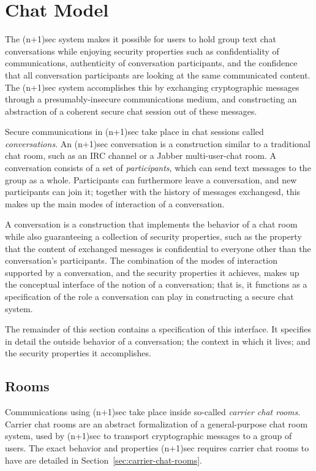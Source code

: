 \documentclass{article}
\begin{document}
\section{Chat Model}
\label{sec:chat-model}

The (n+1)sec system makes it possible for users to hold group text chat conversations while enjoying security properties such as confidentiality of communications, authenticity of conversation participants, and the confidence that all conversation participants are looking at the same communicated content.
The (n+1)sec system accomplishes this by exchanging cryptographic messages through a presumably-insecure communications medium, and constructing an abstraction of a coherent secure chat session out of these messages.

Secure communications in (n+1)sec take place in chat sessions called \emph{conversations}.
An (n+1)sec conversation is a construction similar to a traditional chat room, such as an IRC channel or a Jabber multi-user-chat room.
A conversation consists of a set of \emph{participants}, which can send text messages to the group as a whole.
Participants can furthermore leave a conversation, and new participants can join it; together with the history of messages exchangesd, this makes up the main modes of interaction of a conversation.

A conversation is a construction that implements the behavior of a chat room while also guaranteeing a collection of security properties, such as the property that the content of exchanged messages is confidential to everyone other than the conversation's participants.
The combination of the modes of interaction supported by a conversation, and the security properties it achieves, makes up the conceptual interface of the notion of a conversation; that is, it functions as a specification of the role a conversation can play in constructing a secure chat system.

The remainder of this section contains a specification of this interface.
It specifies in detail the outside behavior of a conversation; the context in which it lives; and the security properties it accomplishes.


\subsection{Rooms}
\label{sec:chat-model/rooms}

Communications using (n+1)sec take place inside so-called \emph{carrier chat rooms}.
Carrier chat rooms are an abstract formalization of a general-purpose chat room system, used by (n+1)sec to transport cryptographic messages to a group of users.
The exact behavior and properties (n+1)sec requires carrier chat rooms to have are detailed in Section~\ref{sec:carrier-chat-rooms}.
\end{document}
